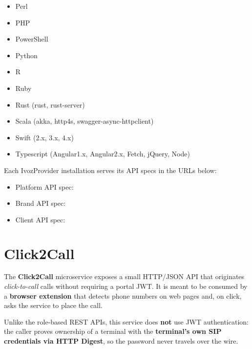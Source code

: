 \documentclass[letterpaper,10pt,english]{sphinxmanual}
\begin{document}
\begin{itemize}
\item {} 
Perl

\item {} 
PHP

\item {} 
PowerShell

\item {} 
Python

\item {} 
R

\item {} 
Ruby

\item {} 
Rust (rust, rust-server)

\item {} 
Scala (akka, http4s, swagger-async-httpclient)

\item {} 
Swift (2.x, 3.x, 4.x)

\item {} 
Typescript (Angular1.x, Angular2.x, Fetch, jQuery, Node)

\end{itemize}

Each IvozProvider installation serves its API specs in the URLs below:
\begin{itemize}
\item {} 
Platform API spec: 

\item {} 
Brand API spec: 

\item {} 
Client API spec: 

\end{itemize}


\chapter{Click2Call}
\label{api_rest/click2call:click2call}\label{api_rest/click2call::doc}\label{api_rest/click2call:id1}
The \textbf{Click2Call} microservice exposes a small HTTP/JSON API that originates
\emph{click-to-call} calls without requiring a portal JWT. It is meant to be consumed
by a \textbf{browser extension} that detects phone numbers on web pages and, on click,
asks the service to place the call.

Unlike the role-based REST APIs, this service does \textbf{not} use JWT authentication:
the caller proves ownership of a terminal with the \textbf{terminal's own SIP
credentials via HTTP Digest}, so the password never travels over the wire.
\end{document}
